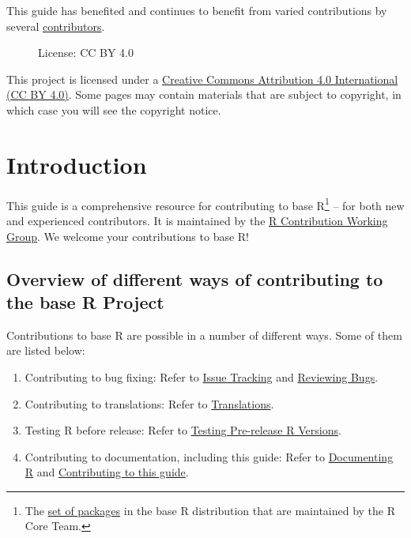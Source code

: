 \documentclass[
  letterpaper,
  DIV=11,
  numbers=noendperiod]{scrreprt}
\makeatletter
\providecommand{\tightlist}{%
  \setlength{\itemsep}{0pt}\setlength{\parskip}{0pt}}\usepackage{longtable,booktabs,array}
\newcommand*\pandocbounded[1]{%
  \sbox\pandoc@box{#1}%
  \Gscale@div\@tempa{\textheight}{\dimexpr\ht\pandoc@box+\dp\pandoc@box\relax}%
  \Gscale@div\@tempb{\linewidth}{\wd\pandoc@box}%
  \ifdim\@tempb\p@<\@tempa\p@\let\@tempa\@tempb\fi%
  \ifdim\@tempa\p@<\p@\scalebox{\@tempa}{\usebox\pandoc@box}%
  \else\usebox{\pandoc@box}%
  \fi%
}
\makeatother
\begin{document}
This guide has benefited and continues to benefit from varied
contributions by several
\href{https://github.com/r-devel/rdevguide\#contributors-}{contributors}.

\begin{figure}[H]

{\centering \pandocbounded{\texttt{[image: img/ccby.png]}}

}

\caption{License: CC BY 4.0}

\end{figure}%

This project is licensed under a
\href{https://creativecommons.org/licenses/by/4.0/}{Creative Commons
Attribution 4.0 International (CC BY 4.0)}. Some pages may contain
materials that are subject to copyright, in which case you will see the
copyright notice.


\chapter{Introduction}\label{introduction}

This guide is a comprehensive resource for contributing to base
R\footnote{The
  \href{https://cran.r-project.org/doc/FAQ/R-FAQ.html\#Add_002don-packages-in-R}{set
  of packages} in the base R distribution that are maintained by the R
  Core Team.} -- for both new and experienced contributors. It is
maintained by the \href{./working-group}{R Contribution Working Group}.
We welcome your contributions to base R!

\section{Overview of different ways of contributing to the base R
Project}\label{overview-of-different-ways-of-contributing-to-the-base-r-project}

Contributions to base R are possible in a number of different ways. Some
of them are listed below:

\begin{enumerate}
\def\labelenumi{\arabic{enumi}.}
\tightlist
\item
  Contributing to bug fixing: Refer to \hyperref[IssueTrack]{Issue
  Tracking} and \hyperref[ReviewBugs]{Reviewing Bugs}.
\item
  Contributing to translations: Refer to
  \hyperref[message-translations]{Translations}.
\item
  Testing R before release: Refer to \hyperref[TestRVer]{Testing
  Pre-release R Versions}.
\item
  Contributing to documentation, including this guide: Refer to
  \hyperref[Doc]{Documenting R} and
  \hyperref[how-to-contribute-to-this-guide]{Contributing to this
  guide}.
\end{enumerate}
\end{document}
